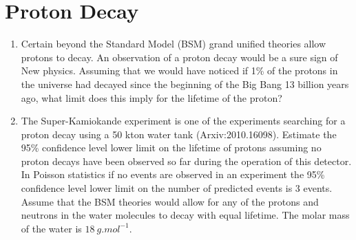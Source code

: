 \documentclass[12pt]{article}
\begin{document}
\section{Proton Decay}
\begin{problem}
  \begin{enumerate}[label=\alph*)]
  \item Certain beyond the Standard Model (BSM) grand unified theories allow protons to decay. An observation of a proton decay would be a sure sign of New physics. Assuming that we would have noticed if 1\% of the protons in the universe had decayed since the beginning of the Big Bang 13 billion years ago, what limit does this imply for the lifetime of the proton?
  \item The Super-Kamiokande experiment is one of the experiments searching for a proton decay using a 50 kton water tank (Arxiv:2010.16098).
Estimate the 95\% confidence level lower limit on the lifetime of protons assuming no proton decays have been observed so far during the operation of this detector. In Poisson statistics if no events are observed in an experiment the 95\% confidence level lower limit on the number of predicted events is 3 events. Assume that the BSM theories would allow for any of the protons and neutrons in the water molecules to decay with equal lifetime. The molar mass of the water is $\SI{18}{g.mol^{-1}}$.
  \end{enumerate}
\end{problem}
\end{document}

